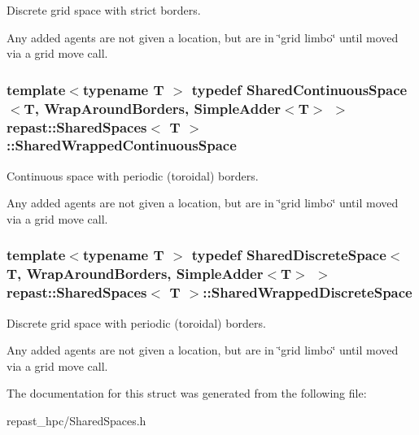 Discrete grid space with strict borders. 

Any added agents are not given a location, but are in \char`\"{}grid limbo\char`\"{} until moved via a grid move call. \hypertarget{structrepast_1_1_shared_spaces_a2c0b9c9945a0f170f744be9002ff5921}{
\subsubsection[{Shared\-Wrapped\-Continuous\-Space}]{\setlength{\rightskip}{0pt plus 5cm}template$<$typename T $>$ typedef {\bf Shared\-Continuous\-Space}$<$T, {\bf Wrap\-Around\-Borders}, {\bf Simple\-Adder}$<$T$>$ $>$ {\bf repast\-::\-Shared\-Spaces}$<$ T $>$\-::{\bf Shared\-Wrapped\-Continuous\-Space}}}\label{structrepast_1_1_shared_spaces_a2c0b9c9945a0f170f744be9002ff5921}


Continuous space with periodic (toroidal) borders. 

Any added agents are not given a location, but are in \char`\"{}grid limbo\char`\"{} until moved via a grid move call. \hypertarget{structrepast_1_1_shared_spaces_a7e9474c0d17d53353b5e717986dd560f}{
\subsubsection[{Shared\-Wrapped\-Discrete\-Space}]{\setlength{\rightskip}{0pt plus 5cm}template$<$typename T $>$ typedef {\bf Shared\-Discrete\-Space}$<$T, {\bf Wrap\-Around\-Borders}, {\bf Simple\-Adder}$<$T$>$ $>$ {\bf repast\-::\-Shared\-Spaces}$<$ T $>$\-::{\bf Shared\-Wrapped\-Discrete\-Space}}}\label{structrepast_1_1_shared_spaces_a7e9474c0d17d53353b5e717986dd560f}


Discrete grid space with periodic (toroidal) borders. 

Any added agents are not given a location, but are in \char`\"{}grid limbo\char`\"{} until moved via a grid move call. 

The documentation for this struct was generated from the following file\-:\begin{DoxyCompactItemize}
\item 
repast\-\_\-hpc/Shared\-Spaces.\-h\end{DoxyCompactItemize}
